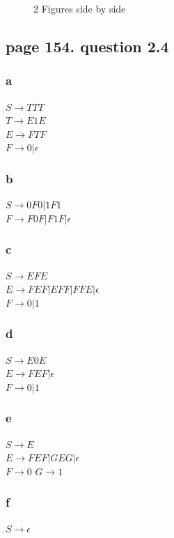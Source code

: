 \documentclass[a4paper,10pt,titlepage]{report}
\begin{document}
\begin{figure}[h]%
    \centering
    \qquad
	\qquad
    \caption{2 Figures side by side}%
    \label{fig:example}%
\end{figure}

\subsection{page 154. question 2.4}
\begin{multicols}{2}
\subsubsection{a}
$ S \rightarrow TTT $\\
$ T \rightarrow E1E $\\
$ E \rightarrow FTF $\\
$ F \rightarrow 0 | \epsilon $\\
\subsubsection{b}
$ S \rightarrow 0F0 | 1F1 $\\
$ F \rightarrow F0F | F1F | \epsilon $\\
\subsubsection{c}
$ S \rightarrow EFE $\\
$ E \rightarrow FEF | EFF | FFE | \epsilon $\\
$ F \rightarrow 0 | 1$
\subsubsection{d}
$ S \rightarrow E0E $\\
$ E \rightarrow FEF | \epsilon $\\
$ F \rightarrow 0 | 1$
\subsubsection{e}
$ S \rightarrow E $\\
$ E \rightarrow FEF | GEG | \epsilon $\\
$ F \rightarrow 0 $
$ G \rightarrow 1 $
\subsubsection{f}
$ S \rightarrow \epsilon $ \\


\end{multicols}
\newpage
\end{document}
